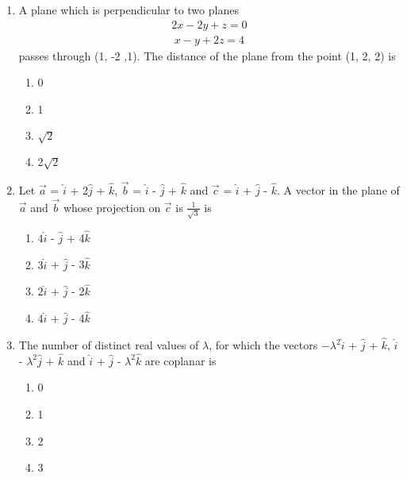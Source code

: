 \begin{enumerate}[label=\arabic*.,ref=\thesubsection.\theenumi]
\item A plane which is perpendicular to two planes 
\begin{align}
2x - 2y + z = 0
\end{align}
\begin{align}
x - y + 2z = 4
\end{align}
passes through (1, -2 ,1). The distance of the plane from the point (1, 2, 2) is
\begin{enumerate}
\item 0
\item 1
\item $\sqrt{2}$
\item 2$\sqrt{2}$
\end{enumerate}

\item Let $\overrightarrow{a}$ = $\hat{i}$ + 2$\hat{j}$ + $\hat{k}$, $\overrightarrow{b}$ = $\hat{i}$ - $\hat{j}$ + $\hat{k}$ and $\overrightarrow{c}$ = $\hat{i}$ + $\hat{j}$ - $\hat{k}$. A vector in the plane of $\overrightarrow{a}$ and $\overrightarrow{b}$ whose projection on $\overrightarrow{c}$ is $\frac{1}{\sqrt{3}}$ is
\begin{enumerate}
\item $4\hat{i}$ - $\hat{j}$ + 4$\hat{k}$
\item $3\hat{i}$ + $\hat{j}$ - 3$\hat{k}$
\item $2\hat{i}$ + $\hat{j}$ - 2$\hat{k}$
\item $4\hat{i}$ + $\hat{j}$ - 4$\hat{k}$
\end{enumerate}

\item The number of distinct real values of $\lambda$, for which the vectors $-\lambda^{2}\hat{i}$ + $\hat{j}$ + $\hat{k}$, $\hat{i}$ - $\lambda^{2}\hat{j}$ + $\hat{k}$ and $\hat{i}$ + $\hat{j}$ - $\lambda^{2}\hat{k}$ are coplanar is
\begin{enumerate}
\item 0
\item 1
\item 2
\item 3
\end{enumerate}


\end{enumerate}
